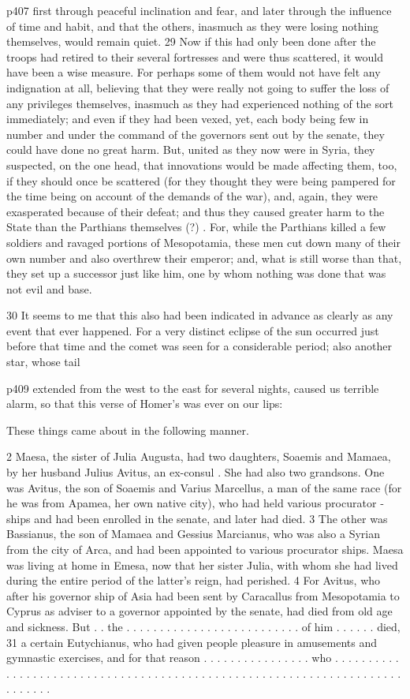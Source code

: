 p407 first through peaceful inclination and fear, and later through the influence of time and habit, and that the others, inasmuch as they were losing nothing themselves, would remain quiet. 29
Now if this had only been done after the troops had retired to their several fortresses and were thus scattered, it would have been a wise measure. For perhaps some of them would not have felt any indignation at all, believing that they were really not going to suffer the loss of any privileges themselves, inasmuch as they had experienced nothing of the sort immediately; and even if they had been vexed, yet, each body being few in number and under the command of the governors sent out by the senate, they could have done no great harm. But, united as they now were in Syria, they suspected, on the one head, that innovations would be made affecting them, too, if they should once be scattered (for they thought they were being pampered for the time being on account of the demands of the war), and, again, they were exasperated because of their defeat; and thus they caused greater harm to the State than the Parthians themselves (?) . For, while the Parthians killed a few soldiers and ravaged portions of Mesopotamia, these men cut down many of their own number and also overthrew their emperor; and, what is still worse than that, they set up a successor just like him, one by whom nothing was done that was not evil and base.

30
It seems to me that this also had been indicated in advance as clearly as any event that ever happened. For a very distinct eclipse of the sun occurred just before that time and the comet was seen for a considerable period; also another star, whose tail

p409 extended from the west to the east for several nights, caused us terrible alarm, so that this verse of Homer's was ever on our lips:

These things came about in the following manner.

2
Maesa, the sister of Julia Augusta, had two daughters, Soaemis and Mamaea, by her husband Julius Avitus, an ex-consul . She had also two grandsons. One was Avitus, the son of Soaemis and Varius Marcellus, a man of the same race (for he was from Apamea, her own native city), who had held various procurator ­ships and had been enrolled in the senate, and later had died. 3 The other was Bassianus, the son of Mamaea and Gessius Marcianus, who was also a Syrian from the city of Arca, and had been appointed to various procurator ­ships. Maesa was living at home in Emesa, now that her sister Julia, with whom she had lived during the entire period of the latter's reign, had perished. 4 For Avitus, who after his governor ­ship of Asia had been sent by Caracallus from Mesopotamia to Cyprus as adviser to a governor appointed by the senate, had died from old age and sickness. But . . the . . . . . . . . . . . . . . . . . . . . . . . . . . of him . . . . . . died, 31
a certain Eutychianus, who had given people pleasure in amusements and gymnastic exercises, and for that reason . . . . . . . . . . . . . . . . who . . . . . . . . . . . . . . . . . . . . . . . . . . . . . . . . . . . . . . . . . . . . . . . . . . . . . . . . . . . . . . . . . . . . . . . . . . . .

